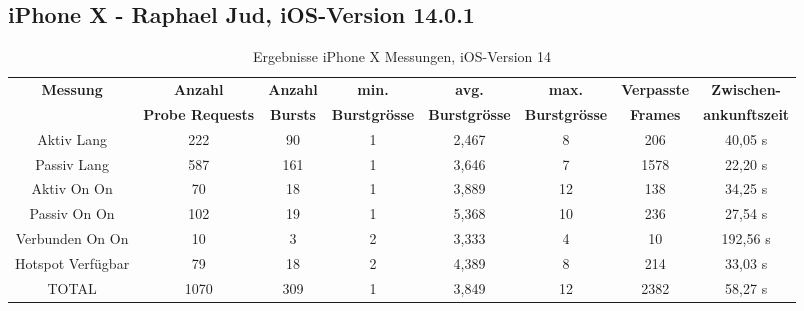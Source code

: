 \begin{landscape}
   \subsection*{iPhone X - Raphael Jud, iOS-Version 14.0.1}
   \begin{table}[h!]
      \centering
      \begin{tabular}{|c|c|c|c|c|c|c|c|}
      \hline
      \textbf{Messung} & \textbf{Anzahl} & \textbf{Anzahl} & \textbf{min.} & \textbf{avg.} & \textbf{max.} & \textbf{Verpasste} & \textbf{Zwischen-}\\
      & \textbf{Probe Requests} & \textbf{Bursts} & \textbf{Burstgrösse} & \textbf{Burstgrösse} & \textbf{Burstgrösse} & \textbf{Frames} & \textbf{ankunftszeit}\\
      \hline
      Aktiv Lang & \phantom{0}222 & \phantom{0}90 & 1 & 2,467 & \phantom{0}8 & \phantom{0}206 & \phantom{0}40,05 s \\
      Passiv Lang & \phantom{0}587 & 161 & 1 & 3,646 & \phantom{0}7 & 1578 & \phantom{0}22,20 s \\
      Aktiv On On & \phantom{00}70 & \phantom{0}18 & 1 & 3,889 & 12 & \phantom{0}138 & \phantom{0}34,25 s \\
      Passiv On On & \phantom{0}102 & \phantom{0}19 & 1 & 5,368 & 10 & \phantom{0}236 & \phantom{0}27,54 s \\
      Verbunden On On & \phantom{00}10 & \phantom{00}3 & 2 & 3,333 & \phantom{0}4 & \phantom{00}10 & 192,56 s \\
      Hotspot Verfügbar & \phantom{00}79 & \phantom{0}18 & 2 & 4,389 & \phantom{0}8 & \phantom{0}214 & \phantom{0}33,03 s \\
      \hline
      TOTAL & 1070 & 309 & 1 & 3,849 & 12 & 2382 & \phantom{0}58,27 s\\
      \hline
      \end{tabular}
      \caption{Ergebnisse iPhone X Messungen, iOS-Version 14
      \label{table:iphoneXJud-14-results}} 
   \end{table}

   \clearpage 


\end{landscape}
